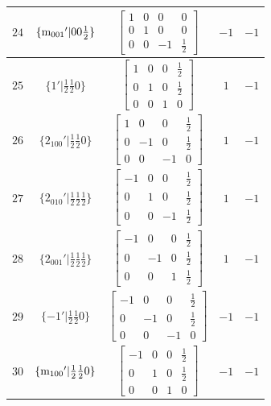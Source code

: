 \documentclass[fleqn,8pt]{jsarticle}
\begin{document}
\begin{longtable}{ccccc}
$ 24 $ & $ \{{\rm m}_{001}{}'|0 0 \frac{1}{2}\} $ & $ \begin{bmatrix} 1 & 0 & 0 & 0 \\ 0 & 1 & 0 & 0 \\ 0 & 0 & -1 & \frac{1}{2} \end{bmatrix} $ & $ -1 $ & $ -1 $ \\ \hline
$ 25 $ & $ \{1{}'|\frac{1}{2} \frac{1}{2} 0\} $ & $ \begin{bmatrix} 1 & 0 & 0 & \frac{1}{2} \\ 0 & 1 & 0 & \frac{1}{2} \\ 0 & 0 & 1 & 0 \end{bmatrix} $ & $ 1 $ & $ -1 $ \\ \hline
$ 26 $ & $ \{2{}_{100}{}'|\frac{1}{2} \frac{1}{2} 0\} $ & $ \begin{bmatrix} 1 & 0 & 0 & \frac{1}{2} \\ 0 & -1 & 0 & \frac{1}{2} \\ 0 & 0 & -1 & 0 \end{bmatrix} $ & $ 1 $ & $ -1 $ \\ \hline
$ 27 $ & $ \{2{}_{010}{}'|\frac{1}{2} \frac{1}{2} \frac{1}{2}\} $ & $ \begin{bmatrix} -1 & 0 & 0 & \frac{1}{2} \\ 0 & 1 & 0 & \frac{1}{2} \\ 0 & 0 & -1 & \frac{1}{2} \end{bmatrix} $ & $ 1 $ & $ -1 $ \\ \hline
$ 28 $ & $ \{2{}_{001}{}'|\frac{1}{2} \frac{1}{2} \frac{1}{2}\} $ & $ \begin{bmatrix} -1 & 0 & 0 & \frac{1}{2} \\ 0 & -1 & 0 & \frac{1}{2} \\ 0 & 0 & 1 & \frac{1}{2} \end{bmatrix} $ & $ 1 $ & $ -1 $ \\ \hline
$ 29 $ & $ \{-1{}'|\frac{1}{2} \frac{1}{2} 0\} $ & $ \begin{bmatrix} -1 & 0 & 0 & \frac{1}{2} \\ 0 & -1 & 0 & \frac{1}{2} \\ 0 & 0 & -1 & 0 \end{bmatrix} $ & $ -1 $ & $ -1 $ \\ \hline
$ 30 $ & $ \{{\rm m}_{100}{}'|\frac{1}{2} \frac{1}{2} 0\} $ & $ \begin{bmatrix} -1 & 0 & 0 & \frac{1}{2} \\ 0 & 1 & 0 & \frac{1}{2} \\ 0 & 0 & 1 & 0 \end{bmatrix} $ & $ -1 $ & $ -1 $ \\ \hline

\end{longtable}
\end{document}
